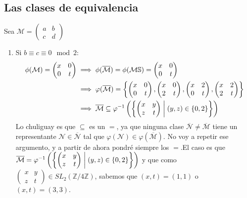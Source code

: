 \documentclass{article}
\newcommand\tab[1][0.6cm]{\hspace*{#1}}
\newcommand\nl{\newline\tab}
\newcommand{\suchthat}{\;\ifnum\currentgrouptype=16 \middle\fi|\;}
\begin{document}
	\subsection{Las clases de equivalencia}
	Sea $ \mathcal{M} = 
	\begin{pmatrix}
	a & b \\
	c & d 
	\end{pmatrix} $
	\begin{enumerate}
		\item Si $b \equiv c \equiv 0 \mod 2$:
		\begin{align*}
		\phi(\mathcal{M}) = 
		\begin{pmatrix}
			x & 0 \\
			0 & t
		\end{pmatrix}  & \implies
		\phi(\overline{\mathcal{M}}) = 
		\phi(\mathcal{M}\mathbb{S}) =
		\begin{pmatrix}
			x & 0 \\
			0 & t 
		\end{pmatrix}\\ 
		& 	\implies \varphi(\overline{\mathcal{M}}) = 	
		\left\{
		\begin{pmatrix}
		x & 0 \\
		0 & t 
		\end{pmatrix},
		\begin{pmatrix}
		x & 0 \\
		2 & t 
		\end{pmatrix},
		\begin{pmatrix}
		x & 2 \\
		0 & t 
		\end{pmatrix},
		\begin{pmatrix}
		x & 2 \\
		2 & t 
		\end{pmatrix}
		\right\}	
		\\ & \implies \overline{\mathcal{M}} \subseteq 
		\varphi^{-1}\left(	\left\{
		\begin{pmatrix}
		x & y \\
		z & t 
		\end{pmatrix}
		\suchthat
		(y,z) \in \{0,2\}
		\right\}	
		\right) 
		\end{align*}
		Lo chuliguay es que $\subseteq $ es un $=$, ya que ninguna clase $\overline{\mathcal{N}} \neq \overline{\mathcal{M}}$ tiene un representante $\mathcal{N} \in \overline{\mathcal{N}}$ tal que  $\varphi(\mathcal{N}) \in \varphi(\overline{\mathcal{M}})$. No voy a repetir ese argumento, y a partir de ahora pondré siempre los $=$.\newline \newline	El caso es que 
		$
		\overline{\mathcal{M}} =
		\varphi^{-1}\left( 
		\left\{
		\begin{pmatrix}
		x & y \\
		z & t 
		\end{pmatrix}
		\suchthat
		(y,z) \in \{0,2\}
		\right\}	
		\right)$ y que como 
		$ \begin{pmatrix}
		x & y \\
		z & t 
		\end{pmatrix} 
		\in SL_2(\mathbb{Z}/ 4\mathbb{Z}) $, sabemos que $(x, t) = (1,1)$ o $(x, t) = (3,3)$.\nl 
		

\end{enumerate}
\end{document}
